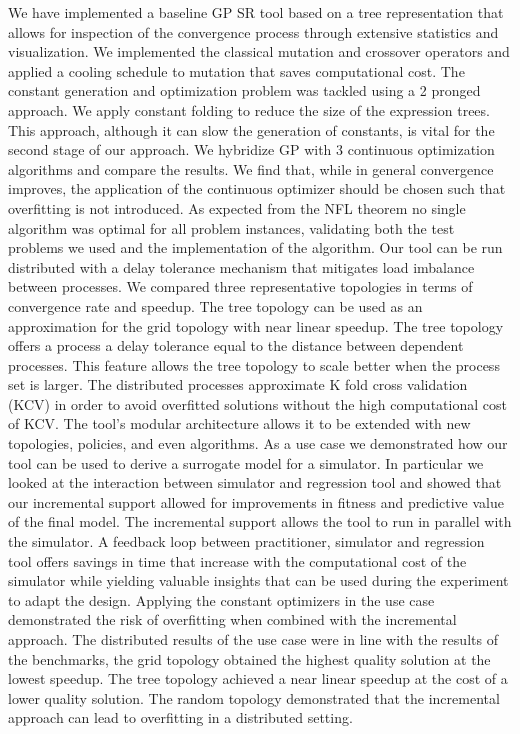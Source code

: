 
We have implemented a baseline GP SR tool based on a tree representation that allows for inspection of the convergence process through extensive statistics and visualization. We implemented the classical mutation and crossover operators and applied a cooling schedule to mutation that saves computational cost. 
The constant generation and optimization problem was tackled using a 2 pronged approach. We apply constant folding to reduce the size of the expression trees. This approach, although it can slow the generation of constants, is vital for the second stage of our approach. We hybridize GP with 3 continuous optimization algorithms and compare the results. We find that, while in general convergence improves, the application of the continuous optimizer should be chosen such that overfitting is not introduced.
As expected from the NFL theorem no single algorithm was optimal for all problem instances, validating both the test problems we used and the implementation of the algorithm.
Our tool can be run distributed with a delay tolerance mechanism that mitigates load imbalance between processes. We compared three representative topologies in terms of convergence rate and speedup. The tree topology can be used as an approximation for the grid topology with near linear speedup. The tree topology offers a process a delay tolerance equal to the distance between dependent processes. This feature allows the tree topology to scale better when the process set is larger. 
The distributed processes approximate K fold cross validation (KCV) in order to avoid overfitted solutions without the high computational cost of KCV. 
The tool's modular architecture allows it to be extended with new topologies, policies, and even algorithms. 
As a use case we demonstrated how our tool can be used to derive a surrogate model for a simulator. In particular we looked at the interaction between simulator and regression tool and showed that our incremental support allowed for improvements in fitness and predictive value of the final model. The incremental support allows the tool to run in parallel with the simulator. A feedback loop between practitioner, simulator and regression tool offers savings in time that increase with the computational cost of the simulator while yielding valuable insights that can be used during the experiment to adapt the design.
Applying the constant optimizers in the use case demonstrated the risk of overfitting when combined with the incremental approach. 
The distributed results of the use case were in line with the results of the benchmarks, the grid topology obtained the highest quality solution at the lowest speedup. The tree topology achieved a near linear speedup at the cost of a lower quality solution. The random topology demonstrated that the incremental approach can lead to overfitting in a distributed setting.